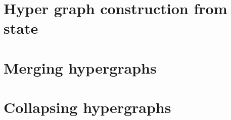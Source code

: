 \documentclass[..\Master.tex]{subfiles}
\providecommand{\master}{..}
\begin{document}
\section{Hyper graph construction from state}
	

\section{Merging hypergraphs}\label{sec:C:HGMerging}
    

\section{Collapsing hypergraphs}
	

%	
\end{document}
